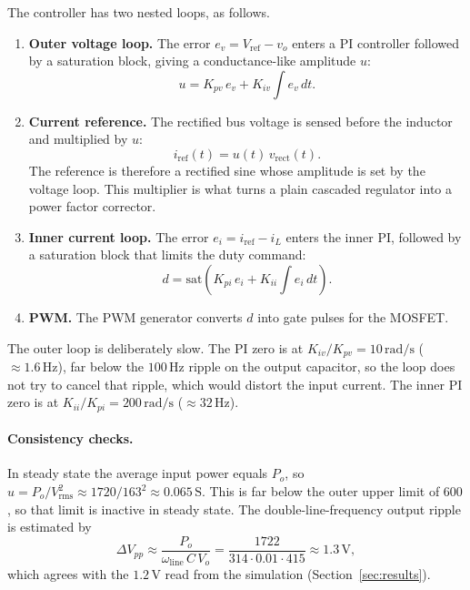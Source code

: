 \documentclass[11pt,a4paper]{article}
\begin{document}
The controller has two nested loops, as follows.
\begin{enumerate}[nosep]
  \item \textbf{Outer voltage loop.} The error $e_v = V_\mathrm{ref}-v_o$ enters a PI controller followed by a saturation block, giving a conductance-like amplitude $u$:
  \begin{equation}
    u = K_{pv}\,e_v + K_{iv}\!\int e_v\,dt .
  \end{equation}
  \item \textbf{Current reference.} The rectified bus voltage is sensed before the inductor and multiplied by $u$:
  \begin{equation}
    i_\mathrm{ref}(t) = u(t)\,v_\mathrm{rect}(t).
  \end{equation}
  The reference is therefore a rectified sine whose amplitude is set by the voltage loop. This multiplier is what turns a plain cascaded regulator into a power factor corrector.
  \item \textbf{Inner current loop.} The error $e_i = i_\mathrm{ref}-i_L$ enters the inner PI, followed by a saturation block that limits the duty command:
  \begin{equation}
    d = \mathrm{sat}\!\left(K_{pi}\,e_i +   K_{ii}\!\int e_i\,dt\right).
  \end{equation}
  \item \textbf{PWM.} The PWM generator converts $d$ into gate pulses for the MOSFET.
\end{enumerate}

The outer loop is deliberately slow. The PI zero is at $K_{iv}/K_{pv}=10\,\mathrm{rad/s}$ ($\approx 1.6\,\mathrm{Hz}$), far below the $100\,\mathrm{Hz}$ ripple on the output capacitor, so the loop does not try to cancel that ripple, which would distort the input current. The inner PI zero is at $K_{ii}/K_{pi}=200\,\mathrm{rad/s}$ ($\approx 32\,\mathrm{Hz}$).

\paragraph{Consistency checks.} In steady state the average input power equals $P_o$, so $u = P_o/V_\mathrm{rms}^2 \approx 1720/163^2 \approx 0.065\,\mathrm{S}$. This is far below the outer upper limit of $600$, so that limit is inactive in steady state. The double-line-frequency output ripple is estimated by
\begin{equation}
  \Delta V_{pp} \approx \frac{P_o}{\omega_\mathrm{line}\,C\,V_o}
  = \frac{1722}{314\cdot 0.01\cdot 415} \approx 1.3\,\mathrm{V},
\end{equation}
which agrees with the $1.2\,\mathrm{V}$ read from the simulation (Section~\ref{sec:results}).
\end{document}
